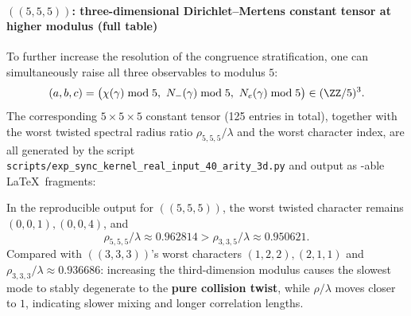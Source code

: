 \paragraph{\texorpdfstring{$((5,5,5))$}{(5,5,5)}: three-dimensional Dirichlet--Mertens constant tensor at higher modulus (full table)}
To further increase the resolution of the congruence stratification, one can simultaneously raise all three observables to modulus $5$:
$$
(a,b,c)=\bigl(\chi(\gamma)\bmod 5,\ N_-(\gamma)\bmod 5,\ N_e(\gamma)\bmod 5\bigr)\in(\ZZ/5)^3.
$$
The corresponding $5\times 5\times 5$ constant tensor (125 entries in total), together with the worst twisted spectral radius ratio $\rho_{5,5,5}/\lambda$ and the worst character index, are all generated by the script
\texttt{scripts/exp\_sync\_kernel\_real\_input\_40\_arity\_3d.py}
and output as \verb||-able \LaTeX\ fragments:


\begin{remark}\label{cor:arity-555-collision-universal}
In the reproducible output for $((5,5,5))$, the worst twisted character remains $(0,0,1),(0,0,4)$, and
\[
\rho_{5,5,5}/\lambda\approx 0.962814> \rho_{3,3,5}/\lambda\approx 0.950621.
\]
Compared with $((3,3,3))$'s worst characters $(1,2,2),(2,1,1)$ and $\rho_{3,3,3}/\lambda\approx 0.936686$:
increasing the third-dimension modulus causes the slowest mode to stably degenerate to the \textbf{pure collision twist}, while $\rho/\lambda$ moves closer to $1$, indicating slower mixing and longer correlation lengths.
\end{remark}

